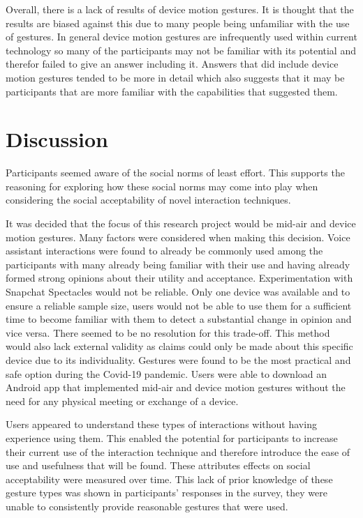 \documentclass{l4proj}
\begin{document}
Overall, there is a lack of results of device motion gestures. It is thought that the results are biased against this due to many people being unfamiliar with the use of gestures. In general device motion gestures are infrequently used within current technology so many of the participants may not be familiar with its potential and therefor failed to give an answer including it. Answers that did include device motion gestures tended to be more in detail which also suggests that it may be participants that are more familiar with the capabilities that suggested them.

\section{Discussion}

Participants seemed aware of the social norms of least effort. This supports the reasoning for exploring how these social norms may come into play when considering the social acceptability of novel interaction techniques.

It was decided that the focus of this research project would be mid-air and device motion gestures. Many factors were considered when making this decision. Voice assistant interactions were found to already be commonly used among the participants with many already being familiar with their use and having already formed strong opinions about their utility and acceptance. Experimentation with Snapchat Spectacles would not be reliable. Only one device was available and to ensure a reliable sample size, users would not be able to use them for a sufficient time to become familiar with them to detect a substantial change in opinion and vice versa. There seemed to be no resolution for this trade-off. This method would also lack external validity as claims could only be made about this specific device due to its individuality. Gestures were found to be the most practical and safe option during the Covid-19 pandemic. Users were able to download an Android app that implemented mid-air and device motion gestures without the need for any physical meeting or exchange of a device. 

Users appeared to understand these types of interactions without having experience using them. This enabled the potential for participants to increase their current use of the interaction technique and therefore introduce the ease of use and usefulness that will be found. These attributes effects on social acceptability were measured over time. This lack of prior knowledge of these gesture types was shown in participants' responses in the survey, they were unable to consistently provide reasonable gestures that were used. 
\end{document}
